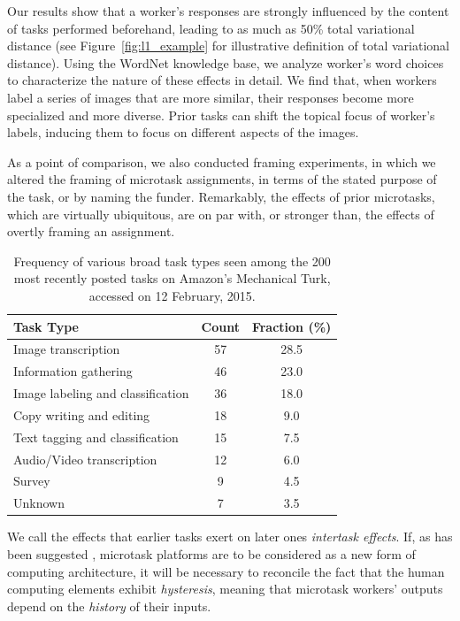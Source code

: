 \documentclass{sigchi}
\begin{document}
Our results show that a worker's responses are strongly influenced by 
the content of tasks performed beforehand, leading to as much as 50\%
total variational distance (see Figure~\ref{fig:l1_example} for 
illustrative definition of total variational distance).  
Using the WordNet 
knowledge base, we analyze worker's word choices to characterize 
the nature of these effects in detail.  We find that, when workers 
label a series of images that are more similar, their responses become 
more specialized and more diverse.  
Prior tasks can shift the topical focus of 
worker's labels, inducing them to focus on different aspects of the images.

As a point of comparison, we also conducted framing experiments, 
in which we altered the framing of microtask assignments, in terms of the 
stated purpose of the task, or by naming the funder.
Remarkably, the effects of prior microtasks,
which are virtually ubiquitous, are on par with, or stronger than, 
the effects of overtly framing an assignment.

\begin{table}
\centering
\begin{tabular}{l c c}
\toprule
Task Type & Count & Fraction (\%) \\
\toprule
Image transcription & 57 & 28.5 \\
Information gathering & 46 & 23.0 \\
Image labeling and classification & 36 & 18.0 \\
Copy writing and editing & 18 & 9.0 \\
Text tagging and classification & 15 & 7.5 \\
Audio/Video transcription & 12 & 6.0 \\
Survey & 9 & 4.5 \\
Unknown & 7 & 3.5 \\
\bottomrule
\end{tabular}
\caption{
	Frequency of various broad task types seen among the 200 most 
	recently posted tasks on Amazon's Mechanical Turk, 
	accessed on 12 February, 2015.
}
\label{table:task_composition}
\end{table}

We call the effects that earlier tasks exert on later ones 
\textit{intertask effects}.  If, as has been suggested \cite{5543192}, 
microtask platforms are to be considered as a new form of computing 
architecture, it will be necessary to reconcile the fact that the human 
computing elements exhibit \textit{hysteresis}, 
meaning that microtask workers' outputs 
depend on the \textit{history} of their inputs.
\end{document}
